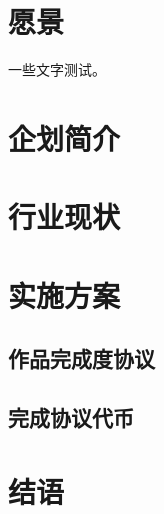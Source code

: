 \documentclass[11pt,UTF8,a4paper]{ctexart}
\begin{document}
    \section{愿景}\label{sec:goal}

    一些文字测试\cite{article}。

    \section{企划简介}\label{sec:intro}


    \section{行业现状}\label{sec:now}


    \section{实施方案}\label{sec:solution}

    \subsection{作品完成度协议}\label{subsec:wca}

    \subsection{完成协议代币}\label{subsec:cat}


    \section{结语}\label{sec:end}

    
    
\end{document}

